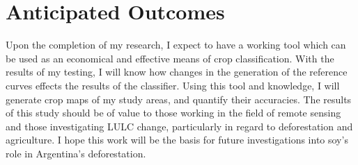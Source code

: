 \section*{Anticipated Outcomes}

Upon the completion of my research, I expect to have a working tool which can be used as an economical and effective means of crop classification. With the results of my testing, I will know how changes in the generation of the reference curves effects the results of the classifier. Using this tool and knowledge, I will generate crop maps of my study areas, and quantify their accuracies. The results of this study should be of value to those working in the field of remote sensing and those investigating LULC change, particularly in regard to deforestation and agriculture. I hope this work will be the basis for future investigations into soy's role in Argentina's deforestation.



















